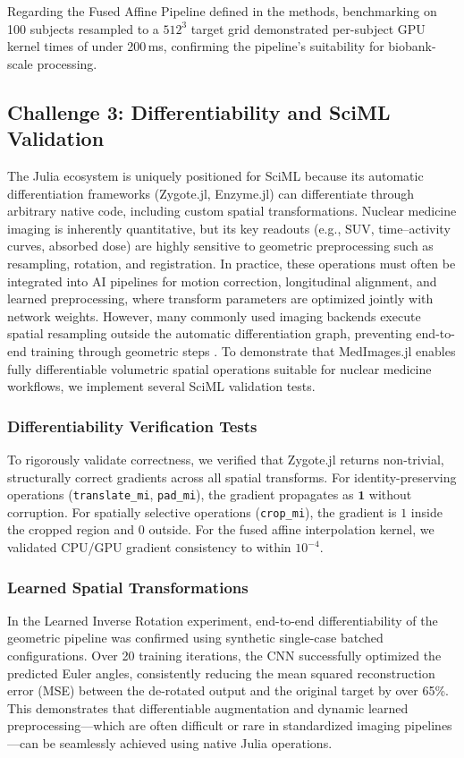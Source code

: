 \documentclass[10pt,letterpaper]{article}
\begin{document}
Regarding the Fused Affine Pipeline defined in the methods, benchmarking on 100 subjects resampled to a $512^3$ target grid demonstrated per-subject GPU kernel times of under 200\,ms, confirming the pipeline's suitability for biobank-scale processing.

\subsection*{Challenge 3: Differentiability and SciML Validation}
The Julia ecosystem is uniquely positioned for SciML because its automatic differentiation frameworks (Zygote.jl, Enzyme.jl) can differentiate through arbitrary native code, including custom spatial transformations. Nuclear medicine imaging is inherently quantitative, but its key readouts (e.g., SUV, time–activity curves, absorbed dose) are highly sensitive to geometric preprocessing such as resampling, rotation, and registration. In practice, these operations must often be integrated into AI pipelines for motion correction, longitudinal alignment, and learned preprocessing, where transform parameters are optimized jointly with network weights. However, many commonly used imaging backends execute spatial resampling outside the automatic differentiation graph, preventing end-to-end training through geometric steps \cite{Berman_2024}. To demonstrate that MedImages.jl enables fully differentiable volumetric spatial operations suitable for nuclear medicine workflows, we implement several SciML validation tests.

\subsubsection*{Differentiability Verification Tests}
To rigorously validate correctness, we verified that Zygote.jl returns non-trivial, structurally correct gradients across all spatial transforms. For identity-preserving operations (\texttt{translate\_mi}, \texttt{pad\_mi}), the gradient propagates as $\mathbf{1}$ without corruption. For spatially selective operations (\texttt{crop\_mi}), the gradient is $1$ inside the cropped region and $0$ outside. For the fused affine interpolation kernel, we validated CPU/GPU gradient consistency to within $10^{-4}$.

\subsubsection*{Learned Spatial Transformations}
In the Learned Inverse Rotation experiment, end-to-end differentiability of the geometric pipeline was confirmed using synthetic single-case batched configurations. Over 20 training iterations, the CNN successfully optimized the predicted Euler angles, consistently reducing the mean squared reconstruction error (MSE) between the de-rotated output and the original target by over 65\%. This demonstrates that differentiable augmentation and dynamic learned preprocessing---which are often difficult or rare in standardized imaging pipelines \cite{Shi_2023}---can be seamlessly achieved using native Julia operations.
\end{document}
